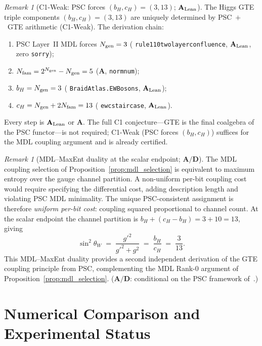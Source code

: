 \documentclass[11pt]{article}
\theoremstyle{remark}
\newtheorem{remark}[theorem]{Remark}
\newcommand{\Ngen}{N_{\rm gen}}
\newcommand{\Nfam}{N_{\rm fam}}
\newcommand{\bH}{b_H}
\newcommand{\cH}{c_H}
\newcommand{\lean}[1]{%
  \penalty-100
  \begingroup\def\_{\textunderscore\allowbreak}\texttt{#1}\endgroup}
\newcommand{\sinwsq}{\sin^2\!\theta_W}
\newcommand{\CatA}{\textbf{A}}
\newcommand{\CatAL}{\ensuremath{\textbf{A}_{\rm Lean}}}
\newcommand{\CatAD}{\textbf{A/D}}
\begin{document}
\begin{remark}[C1-Weak: PSC forces $(\bH, \cH) = (3, 13)$; $\CatAL$]
\label{rem:c1_weak}
The Higgs GTE triple components $(\bH, \cH) = (3, 13)$ are uniquely determined by
PSC~$+$~GTE arithmetic (C1-Weak).
The derivation chain:
\begin{enumerate}[noitemsep,label=(\roman*)]
\item PSC Layer~II MDL forces $\Ngen = 3$
  (\lean{rule110\_two\_layer\_confluence}, $\CatAL$, zero \texttt{sorry});
\item $\Nfam = 2^{\Ngen} - \Ngen = 5$ ($\CatA$, \lean{norm\_num});
\item $\bH = \Ngen = 3$ (\lean{BraidAtlas.EWBosons}, $\CatAL$);
\item $\cH = \Ngen + 2\Nfam = 13$ (\lean{ew\_c\_staircase}, $\CatAL$).
\end{enumerate}
Every step is $\CatAL$ or $\CatA$.
The full C1 conjecture---GTE is the final coalgebra of the PSC functor---is not
required; C1-Weak (PSC forces $(\bH, \cH)$) suffices for the MDL coupling argument
and is already certified.
\end{remark}

\begin{remark}[MDL--MaxEnt duality at the scalar endpoint; $\CatAD$]
\label{rem:mdl_maxent}
The MDL coupling selection of Proposition~\ref{prop:mdl_selection} is equivalent
to maximum entropy over the gauge channel partition.
A non-uniform per-bit coupling cost would require specifying the differential cost,
adding description length and violating PSC MDL minimality.
The unique PSC-consistent assignment is therefore \emph{uniform per-bit cost}:
coupling squared proportional to channel count.
At the scalar endpoint the channel partition is $\bH + (\cH-\bH) = 3 + 10 = 13$,
giving
\[
  \sinwsq \;=\; \frac{g'^2}{g'^2 + g^2}
  \;=\; \frac{\bH}{\cH}
  \;=\; \frac{3}{13}.
\]
This MDL--MaxEnt duality provides a second independent derivation of the GTE
coupling principle from PSC, complementing the MDL Rank-0 argument of
Proposition~\ref{prop:mdl_selection}.
($\CatAD$: conditional on the PSC framework of~\cite{Spivack2025_UGPUniqueness}.)
\end{remark}

\section{Numerical Comparison and Experimental Status}
\label{sec:comparison}
\end{document}
